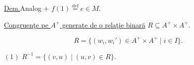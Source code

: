 \medskip
\noindent\underline{Dem.}\quad Analog $+$ $f(1)\overset{\mathrm{def}}{=}e\in M$.

\bigskip
\noindent\underline{Congruen\c{t}e pe $A^+$ generate de o rela\c{t}ie binar\u{a}}
$R\subseteq A^+\times A^+$.

\[
R=\bigl\{(w_i,w_i')\in A^+\times A^+\mid i\in I\bigr\}.
\]

\noindent $(1)$\quad
$R^{-1}=\bigl\{(v,u)\mid (u,v)\in R\bigr\}$.
